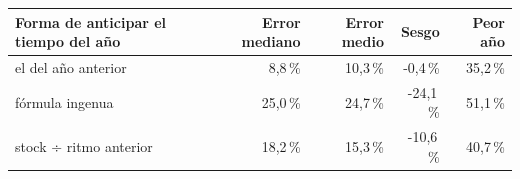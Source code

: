 \begin{tabular}{lrrrr}
\toprule
Forma de anticipar el tiempo del año & Error mediano & Error medio & Sesgo & Peor año \\
\midrule
el del año anterior & 8,8\,\% & 10,3\,\% & -0,4\,\% & 35,2\,\% \\
fórmula ingenua & 25,0\,\% & 24,7\,\% & -24,1\,\% & 51,1\,\% \\
stock ÷ ritmo anterior & 18,2\,\% & 15,3\,\% & -10,6\,\% & 40,7\,\% \\
\bottomrule
\end{tabular}
